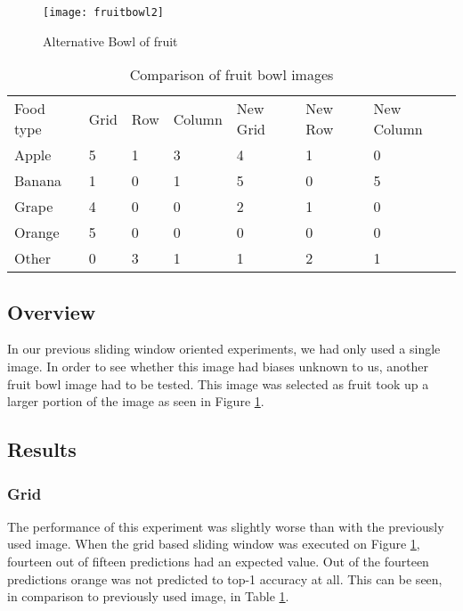 \begin{figure}
    \texttt{[image: fruitbowl2]}
    \caption{Alternative Bowl of fruit}
    \label{fig:newFruit}
\end{figure}

\begin{table}[]
    \centering
    \caption{Comparison of fruit bowl images}
    \label{newFruitTable}
    \begin{tabular}{lllllll}
        Food type & Grid & Row & Column & New Grid & New Row & New Column \\
        Apple     & 5    & 1   & 3      & 4        & 1       & 0          \\
        Banana    & 1    & 0   & 1      & 5        & 0       & 5          \\
        Grape     & 4    & 0   & 0      & 2        & 1       & 0          \\
        Orange    & 5    & 0   & 0      & 0        & 0       & 0          \\
        Other     & 0    & 3   & 1      & 1        & 2       & 1         
    \end{tabular}
\end{table}

\subsection*{Overview}
In our previous sliding window oriented experiments, we had only used a
single image. In order to see whether this image had biases unknown
to us, another fruit bowl image had to be tested. This image was selected as
fruit took up a larger portion of the image as seen in Figure \ref{fig:newFruit}.

\subsection*{Results}
\subsubsection*{Grid}
The performance of this experiment was slightly worse than with the previously
used image. When the grid based sliding window was executed on Figure
\ref{fig:newFruit}, fourteen out of fifteen predictions had an expected value.
Out of the fourteen predictions orange was not predicted to top-1 accuracy at
all. This can be seen, in comparison to previously used image, in Table
\ref{newFruitTable}.

